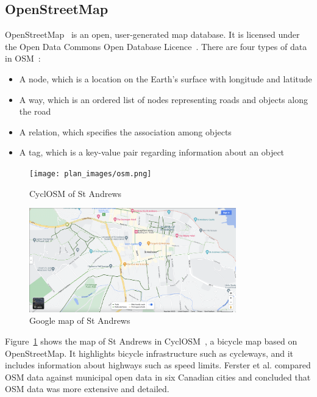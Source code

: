 \documentclass[12pt,a4paper]{report}
\begin{document}
\subsection{OpenStreetMap}
OpenStreetMap~\cite{OpenStreetMap} is an open, user-generated map database. It is licensed under the Open Data Commons Open Database Licence~\cite{odbl}. There are four types of data in OSM~\cite{9119753}:
\begin{itemize}
    \item A node, which is a location on the Earth's surface with longitude and latitude
    \item A way, which is an ordered list of nodes representing roads and objects along the road
    \item A relation, which specifies the association among objects
    \item A tag, which is a key-value pair regarding information about an object
\end{itemize}

\begin{figure}[ht!]
\centering
\texttt{[image: plan\_images/osm.png]}
\caption{CyclOSM of St Andrews}
\label{fig:osm_sta}
\end{figure}

\begin{figure}[ht!]
\centering
\includegraphics[width=0.8\textwidth,trim={10cm 0 10cm 5cm},clip]{plan_images/googlemap.png}
\caption{Google map of St Andrews}
\label{fig:google_sta}
\end{figure}

Figure~\ref{fig:osm_sta} shows the map of St Andrews in CyclOSM~\cite{cycleOSM}, a bicycle map based on OpenStreetMap. It highlights bicycle infrastructure such as cycleways, and it includes information about highways such as speed limits. Ferster et al. \cite{doi:10.1080/15568318.2018.1519746} compared OSM data against municipal open data in six Canadian cities and concluded that OSM data was more extensive and detailed.
\end{document}
